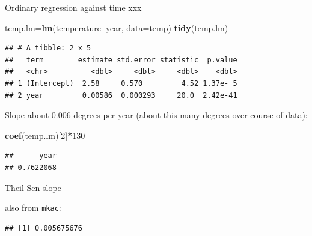 \documentclass[ignorenonframetext,]{beamer}
\newenvironment{Shaded}{\begin{snugshade}}{\end{snugshade}}
\newcommand{\DataTypeTok}[1]{\textcolor[rgb]{0.13,0.29,0.53}{#1}}
\newcommand{\DecValTok}[1]{\textcolor[rgb]{0.00,0.00,0.81}{#1}}
\newcommand{\KeywordTok}[1]{\textcolor[rgb]{0.13,0.29,0.53}{\textbf{#1}}}
\newcommand{\NormalTok}[1]{#1}
\newcommand{\OperatorTok}[1]{\textcolor[rgb]{0.81,0.36,0.00}{\textbf{#1}}}
\begin{document}
\begin{frame}[fragile]{Ordinary regression against time xxx}
\protect\hypertarget{ordinary-regression-against-time-xxx}{}

\normalsize

\begin{Shaded}
\begin{Highlighting}[]
\NormalTok{temp.lm=}\KeywordTok{lm}\NormalTok{(temperature}\OperatorTok{~}\NormalTok{year, }\DataTypeTok{data=}\NormalTok{temp)}
\KeywordTok{tidy}\NormalTok{(temp.lm)}
\end{Highlighting}
\end{Shaded}

\begin{verbatim}
## # A tibble: 2 x 5
##   term        estimate std.error statistic  p.value
##   <chr>          <dbl>     <dbl>     <dbl>    <dbl>
## 1 (Intercept)  2.58     0.570         4.52 1.37e- 5
## 2 year         0.00586  0.000293     20.0  2.42e-41
\end{verbatim}

\normalsize

Slope about 0.006 degrees per year (about this many degrees over course
of data):

\begin{Shaded}
\begin{Highlighting}[]
\KeywordTok{coef}\NormalTok{(temp.lm)[}\DecValTok{2}\NormalTok{]}\OperatorTok{*}\DecValTok{130}
\end{Highlighting}
\end{Shaded}

\begin{verbatim}
##      year 
## 0.7622068
\end{verbatim}

\end{frame}

\begin{frame}[fragile]{Theil-Sen slope}
\protect\hypertarget{theil-sen-slope}{}

also from \texttt{mkac}:

\begin{Shaded}
\end{Shaded}

\begin{verbatim}
## [1] 0.005675676
\end{verbatim}

\end{frame}
\end{document}
